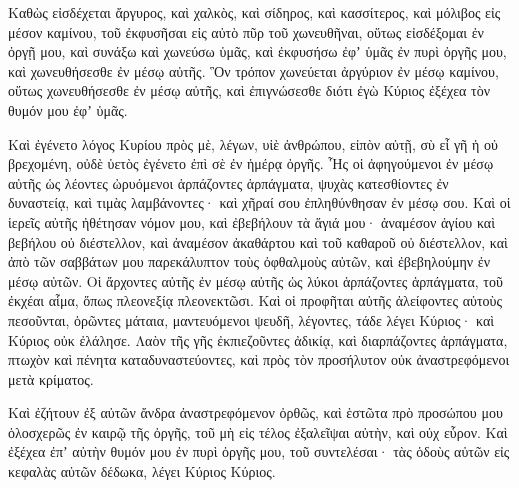 {Καθὼς εἰσδέχεται ἄργυρος, καὶ χαλκὸς, καὶ σίδηρος, καὶ κασσίτερος, καὶ μόλιβος εἰς μέσον καμίνου, τοῦ ἐκφυσῆσαι εἰς αὐτὸ πῦρ τοῦ χωνευθῆναι, οὕτως εἰσδέξομαι ἐν ὀργῇ μου, καὶ συνάξω καὶ χωνεύσω ὑμᾶς,
καὶ ἐκφυσήσω ἐφʼ ὑμᾶς ἐν πυρὶ ὀργῆς μου, καὶ χωνευθήσεσθε ἐν μέσῳ αὐτῆς.
Ὃν τρόπον χωνεύεται ἀργύριον ἐν μέσῳ καμίνου, οὕτως χωνευθήσεσθε ἐν μέσῳ αὐτῆς, καὶ ἐπιγνώσεσθε διότι ἐγὼ Κύριος ἐξέχεα τὸν θυμόν μου ἐφʼ ὑμᾶς.
\par }{\PP {}Καὶ ἐγένετο λόγος Κυρίου πρὸς μὲ, λέγων,
υἱὲ ἀνθρώπου, εἰπὸν αὐτῇ, σὺ εἶ γῆ ἡ οὐ βρεχομένη, οὐδὲ ὑετὸς ἐγένετο ἐπὶ σὲ ἐν ἡμέρᾳ ὀργῆς.
Ἧς οἱ ἀφηγούμενοι ἐν μέσῳ αὐτῆς ὡς λέοντες ὠρυόμενοι ἁρπάζοντες ἁρπάγματα, ψυχὰς κατεσθίοντες ἐν δυναστείᾳ, καὶ τιμὰς λαμβάνοντες· καὶ χῆραί σου ἐπληθύνθησαν ἐν μέσῳ σου.
Καὶ οἱ ἱερεῖς αὐτῆς ἠθέτησαν νόμον μου, καὶ ἐβεβήλουν τὰ ἅγιά μου· ἀναμέσον ἁγίου καὶ βεβήλου οὐ διέστελλον, καὶ ἀναμέσον ἀκαθάρτου καὶ τοῦ καθαροῦ οὐ διέστελλον, καὶ ἀπὸ τῶν σαββάτων μου παρεκάλυπτον τοὺς ὀφθαλμοὺς αὐτῶν, καὶ ἐβεβηλούμην ἐν μέσῳ αὐτῶν.
Οἱ ἄρχοντες αὐτῆς ἐν μέσῳ αὐτῆς ὡς λύκοι ἁρπάζοντες ἁρπάγματα, τοῦ ἐκχέαι αἷμα, ὅπως πλεονεξίᾳ πλεονεκτῶσι.
Καὶ οἱ προφῆται αὐτῆς ἀλείφοντες αὐτοὺς πεσοῦνται, ὁρῶντες μάταια, μαντευόμενοι ψευδῆ, λέγοντες, τάδε λέγει Κύριος· καὶ Κύριος οὐκ ἐλάλησε.
Λαὸν τῆς γῆς ἐκπιεζοῦντες ἀδικίᾳ, καὶ διαρπάζοντες ἁρπάγματα, πτωχὸν καὶ πένητα καταδυναστεύοντες, καὶ πρὸς τὸν προσήλυτον οὐκ ἀναστρεφόμενοι μετὰ κρίματος.
\par }{\PP {}Καὶ ἐζήτουν ἐξ αὐτῶν ἄνδρα ἀναστρεφόμενον ὀρθῶς, καὶ ἑστῶτα πρὸ προσώπου μου ὁλοσχερῶς ἐν καιρῷ τῆς ὀργῆς, τοῦ μὴ εἰς τέλος ἐξαλεῖψαι αὐτὴν, καὶ οὐχ εὗρον.
Καὶ ἐξέχεα ἐπʼ αὐτὴν θυμόν μου ἐν πυρὶ ὀργῆς μου, τοῦ συντελέσαι· τὰς ὁδοὺς αὐτῶν εἰς κεφαλὰς αὐτῶν δέδωκα, λέγει Κύριος Κύριος.

}

